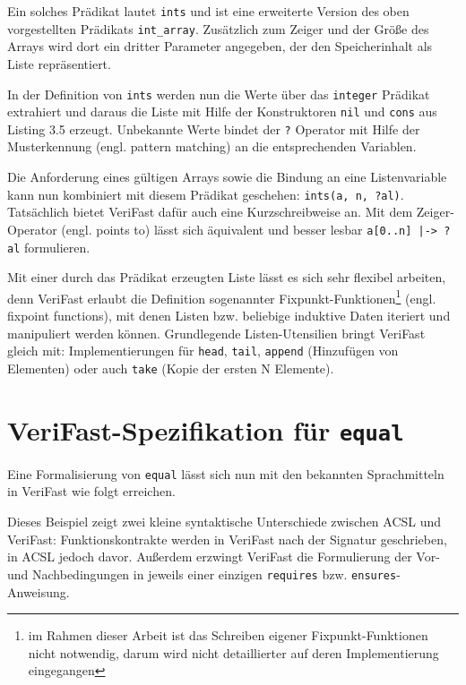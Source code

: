 Ein solches Prädikat lautet \lstinline{ints} und ist eine erweiterte Version des oben vorgestellten Prädikats
\lstinline{int_array}. Zusätzlich zum Zeiger und der Größe des Arrays wird dort ein dritter Parameter angegeben, der
den Speicherinhalt als Liste repräsentiert. 



In der Definition von \lstinline{ints} werden nun die Werte über das \lstinline{integer} Prädikat extrahiert und
daraus die Liste mit Hilfe der Konstruktoren \lstinline{nil} und \lstinline{cons} aus Listing 3.5 erzeugt. Unbekannte
Werte bindet der \lstinline{?} Operator mit Hilfe der Musterkennung (engl. pattern matching) an die entsprechenden
Variablen.

Die Anforderung eines gültigen Arrays sowie die Bindung an eine Listenvariable kann nun kombiniert mit diesem Prädikat
geschehen: \lstinline{ints(a, n, ?al)}. Tatsächlich bietet VeriFast dafür auch eine Kurzschreibweise an. Mit dem Zeiger-Operator
(engl. points to) lässt sich äquivalent und besser lesbar \lstinline{a[0..n] |-> ?al} formulieren.

Mit einer durch das Prädikat erzeugten Liste lässt es sich sehr flexibel arbeiten, denn VeriFast erlaubt 
die Definition sogenannter Fixpunkt-Funktionen\footnote{im Rahmen dieser Arbeit ist das Schreiben eigener
Fixpunkt-Funktionen nicht notwendig, darum wird nicht detaillierter auf deren Implementierung eingegangen} (engl. fixpoint functions), 
mit denen Listen bzw. beliebige induktive Daten iteriert und manipuliert werden können. Grundlegende
Listen-Utensilien bringt VeriFast gleich mit: Implementierungen für \lstinline{head}, 
\lstinline{tail}, \lstinline{append} (Hinzufügen von Elementen) oder auch \lstinline{take} 
(Kopie der ersten N Elemente).


\section{VeriFast-Spezifikation für \texttt{equal}}
\label{sec:design-by-contract:VeriFast-variante}

Eine Formalisierung von \texttt{equal} lässt sich nun mit den bekannten Sprachmitteln in VeriFast wie folgt
erreichen.



Dieses Beispiel zeigt zwei kleine syntaktische Unterschiede zwischen ACSL und VeriFast: Funktionskontrakte
werden in VeriFast nach der Signatur geschrieben, in ACSL jedoch davor. Außerdem erzwingt VeriFast die
Formulierung der Vor- und Nachbedingungen in jeweils einer einzigen \lstinline{requires} bzw. \lstinline{ensures}-Anweisung.

